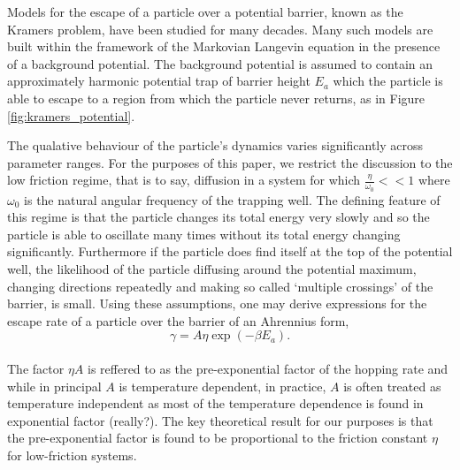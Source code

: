 \documentclass{article}
\begin{document}
Models for the escape of a particle over a potential barrier, known as the Kramers problem, have been studied for many decades. Many such models are built within the framework of the Markovian Langevin equation in the presence of a background potential. The background potential is assumed to contain an approximately harmonic potential trap of barrier height $E_a$ which the particle is able to escape to a region from which the particle never returns, as in Figure \ref{fig:kramers_potential}. 

The qualative behaviour of the particle's dynamics varies significantly across parameter ranges. For the purposes of this paper, we restrict the discussion to the low friction regime, that is to say, diffusion in a system for which $\frac{\eta}{\omega_0} << 1$ where $\omega_0$ is the natural angular frequency of the trapping well. The defining feature of this regime is that the particle changes its total energy very slowly and so the particle is able to oscillate many times without its total energy changing significantly. Furthermore if the particle does find itself at the top of the potential well, the likelihood of the particle diffusing around the potential maximum, changing directions repeatedly and making so called `multiple crossings' of the barrier, is small. Using these assumptions, one may derive expressions for the escape rate of a particle over the barrier of an Ahrennius form, 
\\
$$\gamma = A \eta \exp\left(-\beta E_a \right).$$ 
\\
The factor $\eta A$ is reffered to as the pre-exponential factor of the hopping rate and while in principal $A$ is temperature dependent, in practice, $A$ is often treated as temperature independent as most of the temperature dependence is found in exponential factor (really?). The key theoretical result for our purposes is that the pre-exponential factor is found to be proportional to the friction constant $\eta$ for low-friction systems.
\end{document}
